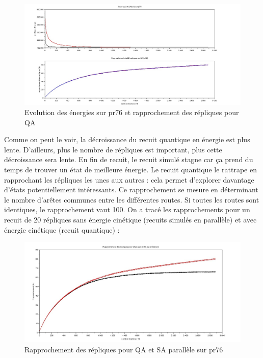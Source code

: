 \documentclass{article}%
\begin{document}
	\begin{figure}[h]
	\begin{center}
	\includegraphics[scale=0.25]{comparaison_pr76.jpg}
	\caption{Evolution des énergies sur pr76 et rapprochement des répliques pour QA}
	\label{QASA}
	\end{center}
	\end{figure}
		
		Comme on peut le voir, la décroissance du recuit quantique en énergie est plus lente. D'ailleurs, plus le nombre de répliques est important, plus cette décroissance sera lente. En fin de recuit, le recuit simulé stagne car ça prend du temps de trouver un état de meilleure énergie. Le recuit quantique le rattrape en rapprochant les répliques les unes aux autres : cela permet d'explorer davantage d'états potentiellement intéressants. 
		Ce rapprochement se mesure en déterminant le nombre d'arêtes communes entre les différentes routes. Si toutes les routes sont identiques, le rapprochement vaut 100. On a tracé les rapprochements pour un recuit de 20 répliques sans énergie cinétique (recuits simulés en parallèle) et avec énergie cinétique (recuit quantique) : 
		
	\begin{figure}[!h]
	\begin{center}
	\includegraphics[scale=0.3]{rapprochement.jpg}
	\caption{Rapprochement des répliques pour QA et SA parallèle sur pr76}
	\end{center}
	\end{figure}
\end{document}
